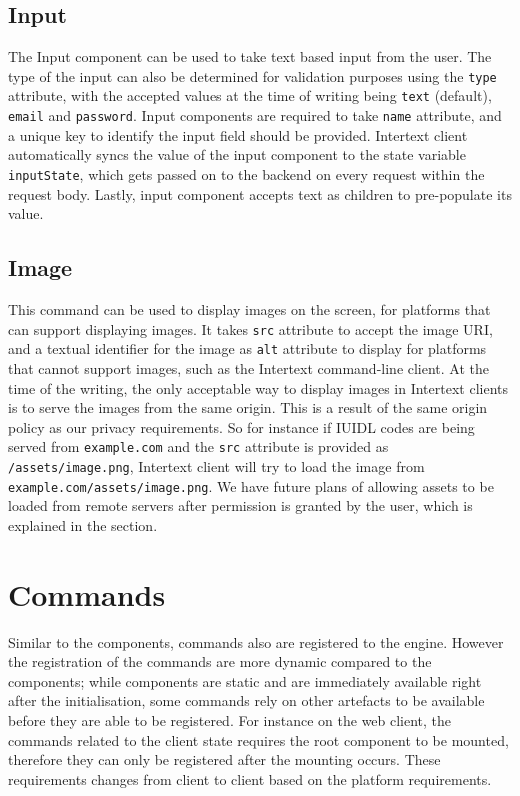 \subsection{Input}

The Input component can be used to take text based input from the user. The type of the input can also be determined for validation purposes using the \texttt{type} attribute, with the accepted values at the time of writing being \texttt{text} (default), \texttt{email} and \texttt{password}. Input components are required to take \texttt{name} attribute, and a unique key to identify the input field should be provided. Intertext client automatically syncs the value of the input component to the state variable \texttt{inputState}, which gets passed on to the backend on every request within the request body. Lastly, input component accepts text as children to pre-populate its value.

\subsection{Image}

This command can be used to display images on the screen, for platforms that can support displaying images. It takes \texttt{src} attribute to accept the image URI, and a textual identifier for the image as \texttt{alt} attribute to display for platforms that cannot support images, such as the Intertext command-line client. At the time of the writing, the only acceptable way to display images in Intertext clients is to serve the images from the same origin. This is a result of the same origin policy as our privacy requirements. So for instance if IUIDL codes are being served from \texttt{example.com} and the \texttt{src} attribute is provided as \texttt{/assets/image.png}, Intertext client will try to load the image from \texttt{example.com/assets/image.png}. We have future plans of allowing assets to be loaded from remote servers after permission is granted by the user, which is explained in the  section.

\section{Commands}

Similar to the components, commands also are registered to the engine. However the registration of the commands are more dynamic compared to the components; while components are static and are immediately available right after the initialisation, some commands rely on other artefacts to be available before they are able to be registered. For instance on the web client, the commands related to the client state requires the root component to be mounted, therefore they can only be registered after the mounting occurs. These requirements changes from client to client based on the platform requirements.

